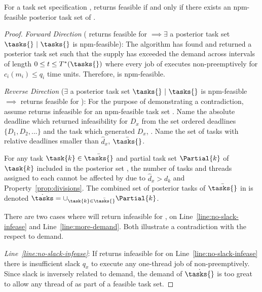 \begin{theorem}
  \label{thm:tpj-optimal}
  For a task set specification \ants{}, \tpj{} returns feasible if and
  only if there exists an npm-feasible posterior task set \tasks{} of
  \ants{}.

  \begin{proof}
    \emph{Forward Direction} (\tpj{} returns feasible for \ants{}
    ${\implies \exists}$ a posterior task set ${\tasks{}~|~\tasks{}}$
    is npm-feasible): The \tpj{} algorithm has found and returned a 
    posterior task set \tasks{} such that the supply has exceeded the
    demand across intervals of length ${0 \le t \le T^*(\tasks{})}$
    where every job of  executes  non-preemptively for
    ${c_i(m_i) \le q_i}$ time units. Therefore, \tasks{} is npm-feasible.

    \emph{Reverse Direction} (${\exists}$ a posterior task set
    ${\tasks{}~|~\tasks{}}$ is npm-feasible ${\implies}$ \tpj{}
    returns feasible for \ants{}): For the purpose of demonstrating a
    contradiction, assume \tpj{} returns infeasible for an
    npm-feasible task set \ants{}. Name the absolute deadline which
    \tpj{} returned infeasibility for ${D_x}$ from the set
    ordered deadlines ${\{D_1, D_2, ... \}}$ and the task which
    generated ${D_x}$, . Name the set of tasks with relative
    deadlines smaller than ${\hat{d}_x}$, ${\bar{\tasks{}}}$. 

    For any task ${\task{k} \in \bar{\tasks{}}}$ and partial task set
    ${\Partial{k}}$ of ${\task{k}}$ included in the posterior set
    \tasks{}, the number of tasks and threads assigned to each
     cannot be affected by  due to
    ${\hat{d}_x > d_k}$ and Property~\ref{prop:divisions}. The
    combined set of posterior tasks of ${\bar{\tasks{}}}$ in \tasks{}
    is denoted
    ${\dot{\tasks} = \cup_{\task{k} \in \bar{\tasks{}}} \Partial{k}}$.
    
    There are two cases where \tpj{} will return infeasible for
    \ants{}, on Line~\ref{line:no-slack-infease} and
    Line~\ref{line:more-demand}. Both illustrate a contradiction with 
    the respect to demand.

    \emph{Line~\ref{line:no-slack-infease}}: If \tpj{} returns
    infeasible for \ants{} on Line~\ref{line:no-slack-infease} there is
    insufficient slack ${q_x}$ to execute any one-thread job of
     non-preemptively. Since slack is inversely related to
    demand, the demand of ${\dot{\tasks{}}}$ is too great to allow any
    thread of  as part of a feasible task set.


\end{proof}
\end{theorem}
